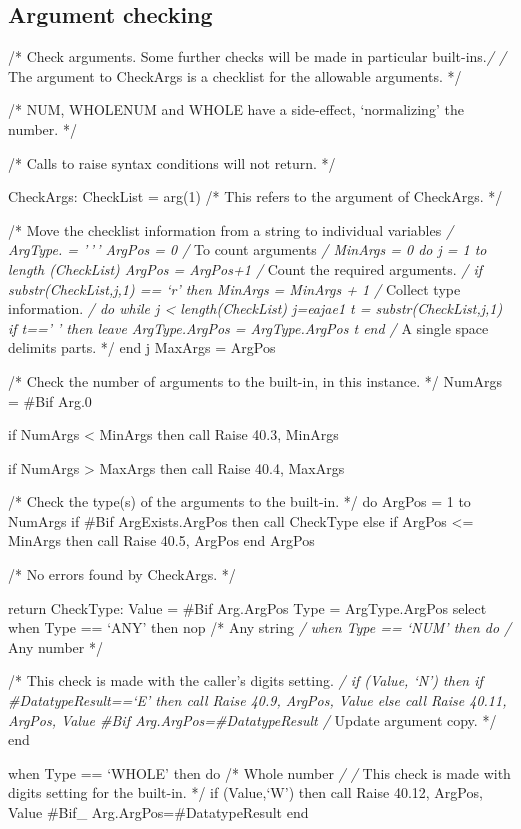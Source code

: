 \subsection{Argument checking}\label{argument-checking}

/* Check arguments. Some further checks will be made in particular
built-ins.\emph{/ /} The argument to CheckArgs is a checklist for the
allowable arguments. */

/* NUM, WHOLENUM and WHOLE have a side-effect, `normalizing' the number.
*/

/* Calls to raise syntax conditions will not return. */

CheckArgs: CheckList = arg(1) /* This refers to the argument of
CheckArgs. */

/* Move the checklist information from a string to individual variables
\emph{/ ArgType. = '\,'\,' ArgPos = 0 /} To count arguments \emph{/
MinArgs = 0 do j = 1 to length (CheckList) ArgPos = ArgPos+1 /} Count
the required arguments. \emph{/ if substr(CheckList,j,1) == `r' then
MinArgs = MinArgs + 1 /} Collect type information. \emph{/ do while j
\textless{} length(CheckList) j=eajae1 t = substr(CheckList,j,1) if t=='
' then leave ArgType.ArgPos = ArgType.ArgPos \textbar\textbar{} t end /}
A single space delimits parts. */ end j MaxArgs = ArgPos

/* Check the number of arguments to the built-in, in this instance. */
NumArgs = \#Bif Arg.0

if NumArgs \textless{} MinArgs then call Raise 40.3, MinArgs

if NumArgs \textgreater{} MaxArgs then call Raise 40.4, MaxArgs

/* Check the type(s) of the arguments to the built-in. */ do ArgPos = 1
to NumArgs if \#Bif ArgExists.ArgPos then call CheckType else if ArgPos
\textless= MinArgs then call Raise 40.5, ArgPos end ArgPos

/* No errors found by CheckArgs. */

return CheckType: Value = \#Bif Arg.ArgPos Type = ArgType.ArgPos select
when Type == `ANY' then nop /* Any string \emph{/ when Type == `NUM'
then do /} Any number */

/* This check is made with the caller's digits setting. \emph{/ if
\Cdatatype(Value, `N') then if \#DatatypeResult==`E' then call Raise
40.9, ArgPos, Value else call Raise 40.11, ArgPos, Value \#Bif
Arg.ArgPos=\#DatatypeResult /} Update argument copy. */ end

when Type == `WHOLE' then do /* Whole number \emph{/ /} This check is
made with digits setting for the built-in. */ if \Edatatype(Value,`W')
then call Raise 40.12, ArgPos, Value \#Bif\_ Arg.ArgPos=\#DatatypeResult
end

